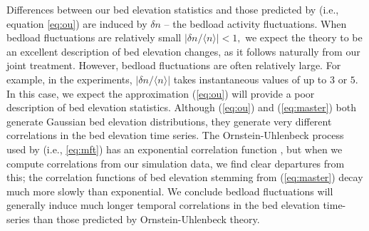 \documentclass[draft]{agujournal2018}
\newcommand\bra{\langle}
\newcommand\ket{\rangle}
\begin{document}
Differences between our bed elevation statistics and those predicted by \citet{Martin2014} (i.e., equation \ref{eq:ou}) are induced by $\delta n$ -- the bedload activity fluctuations.
When bedload fluctuations are relatively small $|\delta n/\bra n \ket|<1,$ we expect the \citet{Martin2014} theory to be an excellent description of bed elevation changes, as it follows naturally from our joint treatment.
However, bedload fluctuations are often relatively large.
For example, in the \citet{Ancey2008} experiments, $|\delta n/\bra n \ket|$ takes instantaneous values of up to $3$ or $5$.
In this case, we expect the approximation (\ref{eq:ou}) will provide a poor description of bed elevation statistics.
Although  (\ref{eq:ou}) and (\ref{eq:master}) both generate Gaussian bed elevation distributions, they generate very different correlations in the bed elevation time series.
The Ornstein-Uhlenbeck process used by \citet{Martin2014} (i.e., \ref{eq:mft}) has an exponential correlation function \citep[e.g.][]{Horsthemke1984,Risken1989}, but when we compute correlations from our simulation data, we find clear departures from this; the correlation functions of bed elevation stemming from (\ref{eq:master}) decay much more slowly than exponential.
We conclude bedload fluctuations will generally induce much longer temporal correlations in the bed elevation time-series than those predicted by Ornstein-Uhlenbeck theory.
\end{document}
